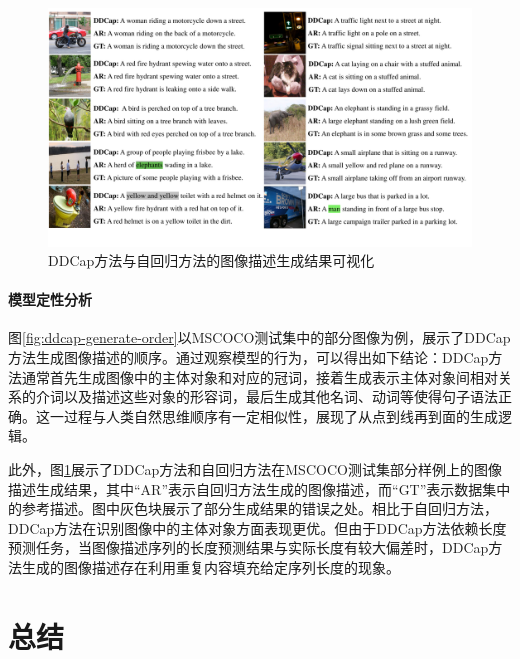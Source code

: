 \begin{figure}
  \centering
  \includegraphics[width=1.0\linewidth]{figures/ddcap-qualification.pdf}
  \caption{DDCap方法与自回归方法的图像描述生成结果可视化}
  \label{fig:ddcap-qualification}
\end{figure}


\paragraph{模型定性分析} 图\ref{fig:ddcap-generate-order}以MSCOCO测试集中的部分图像为例，展示了DDCap方法生成图像描述的顺序。通过观察模型的行为，可以得出如下结论：DDCap方法通常首先生成图像中的主体对象和对应的冠词，接着生成表示主体对象间相对关系的介词以及描述这些对象的形容词，最后生成其他名词、动词等使得句子语法正确。这一过程与人类自然思维顺序有一定相似性，展现了从点到线再到面的生成逻辑。

此外，图\ref{fig:ddcap-qualification}展示了DDCap方法和自回归方法在MSCOCO测试集部分样例上的图像描述生成结果，其中“AR”表示自回归方法生成的图像描述，而“GT”表示数据集中的参考描述。图中灰色块展示了部分生成结果的错误之处。相比于自回归方法，DDCap方法在识别图像中的主体对象方面表现更优。但由于DDCap方法依赖长度预测任务，当图像描述序列的长度预测结果与实际长度有较大偏差时，DDCap方法生成的图像描述存在利用重复内容填充给定序列长度的现象。

\section{总结}
\label{sec:ddcap-summary}

